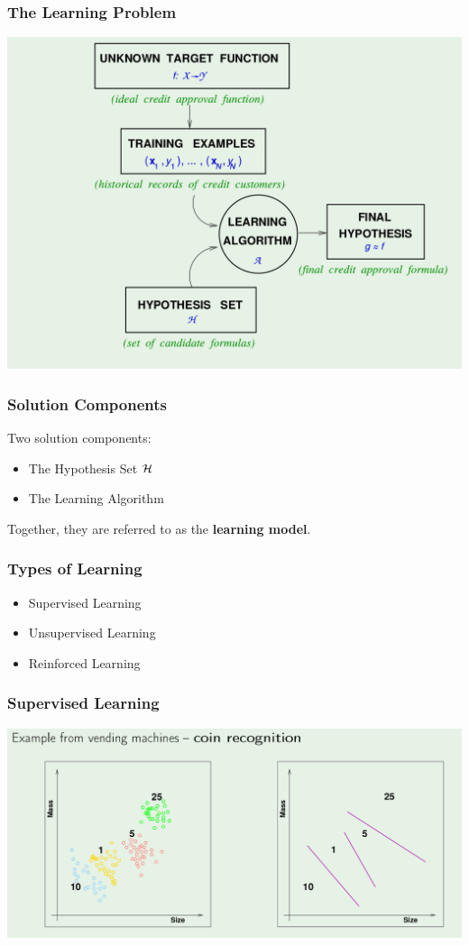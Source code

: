 \documentclass[xcolor=table]{beamer}
\begin{document}
\begin{frame}[t]
\frametitle{The Learning Problem}
\begin{center}
\includegraphics[scale=0.25]{the_learning_problem.png}
\end{center}
\end{frame}

\begin{frame}[t]
\frametitle{Solution Components}
Two solution components:
\begin{itemize}
    \item The Hypothesis Set $\cal{H}$
    \item The Learning Algorithm
\end{itemize}

Together, they are referred to as the \textbf{learning model}.
\end{frame}

\begin{frame}[t]
\frametitle{Types of Learning}
\begin{itemize}
    \item Supervised Learning
    \item Unsupervised Learning
    \item Reinforced Learning 
\end{itemize}
\end{frame}

\begin{frame}[t]
\frametitle{Supervised Learning}
\begin{center}
\includegraphics[scale=0.22]{supervised_learning.png}
\end{center}
\end{frame}
\end{document}

